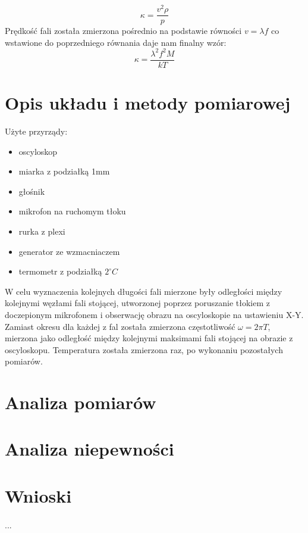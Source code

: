 \documentclass[a4paper,10pt]{article}
\begin{document}
\begin{equation}
  \kappa = \frac{v^2 \rho}{p}
\end{equation}
Prędkość fali została zmierzona pośrednio na podstawie równości $v = \lambda f$ co wstawione do poprzedniego równania daje nam finalny wzór:
\begin{equation}
  \kappa = \frac{\lambda^2 f^2 M}{kT}
\end{equation}

\section{Opis układu i metody pomiarowej}
Użyte przyrządy:
\begin{itemize}
  \item oscyloskop
  \item miarka z podziałką 1mm
  \item głośnik
  \item mikrofon na ruchomym tłoku
  \item rurka z plexi
  \item generator ze wzmacniaczem
  \item termometr z podziałką $2^\circ C$
\end{itemize}
W celu wyznaczenia kolejnych długości fali mierzone były odległości między kolejnymi węzłami fali stojącej, utworzonej poprzez poruszanie tłokiem z
doczepionym mikrofonem i obserwację obrazu na oscyloskopie na ustawieniu X-Y. %
Zamiast okresu dla każdej z fal została zmierzona częstotliwość $\omega = 2 \pi T$, mierzona jako odległość między kolejnymi maksimami fali stojącej na
obrazie z oscyloskopu. Temperatura została zmierzona raz, po wykonaniu pozostałych pomiarów.

\section{Analiza pomiarów}

\section{Analiza niepewności}

\section{Wnioski}
\paragraph{}...
\end{document}
